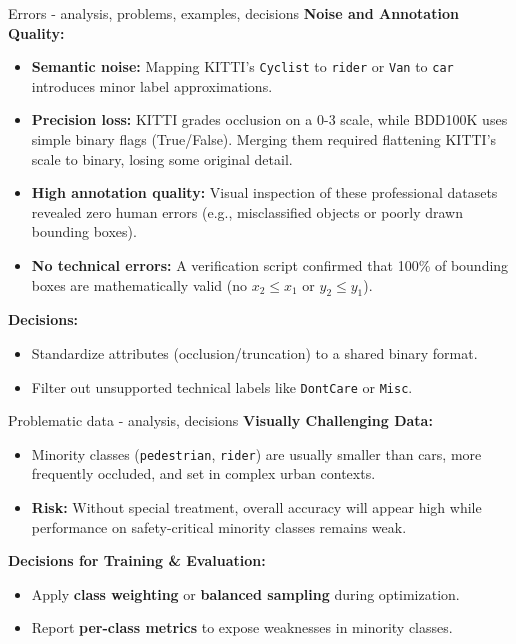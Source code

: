 \documentclass{beamer}
\begin{document}
\begin{frame}{Errors - analysis, problems, examples, decisions}
    \textbf{Noise and Annotation Quality:}
    \begin{itemize}
        \item \textbf{Semantic noise:} Mapping KITTI's \texttt{Cyclist} to \texttt{rider} or \texttt{Van} to \texttt{car} introduces minor label approximations.
        \item \textbf{Precision loss:} KITTI grades occlusion on a 0-3 scale, while BDD100K uses simple binary flags (True/False). Merging them required flattening KITTI's scale to binary, losing some original detail.
        \item \textbf{High annotation quality:} Visual inspection of these professional datasets revealed zero human errors (e.g., misclassified objects or poorly drawn bounding boxes).
        \item \textbf{No technical errors:} A verification script confirmed that 100\% of bounding boxes are mathematically valid (no $x_2 \leq x_1$ or $y_2 \leq y_1$).
    \end{itemize}

    \vspace{0.2cm}
    \textbf{Decisions:}
    \begin{itemize}
        \item Standardize attributes (occlusion/truncation) to a shared binary format.
        \item Filter out unsupported technical labels like \texttt{DontCare} or \texttt{Misc}.
    \end{itemize}
\end{frame}

\begin{frame}{Problematic data - analysis, decisions}
    \textbf{Visually Challenging Data:}
    \begin{itemize}
        \item Minority classes (\texttt{pedestrian}, \texttt{rider}) are usually smaller than cars, more frequently occluded, and set in complex urban contexts.
        \item \textbf{Risk:} Without special treatment, overall accuracy will appear high while performance on safety-critical minority classes remains weak.
    \end{itemize}
    \vspace{0.3cm}
    \textbf{Decisions for Training \& Evaluation:}
    \begin{itemize}
        \item Apply \textbf{class weighting} or \textbf{balanced sampling} during optimization.
        \item Report \textbf{per-class metrics} to expose weaknesses in minority classes.
    \end{itemize}
\end{frame}
\end{document}
